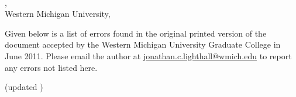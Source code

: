 \providecommand{\code}[1]{{\color{note_gray}#1}}
\cleardoublepage
{}
{}
\sloppy
\pagestyle{empty}
\begin{singlespace}%
\begin{center}
\vspace*{\titleskip}
\thesistitle\\
\vspace*{2.0\baselineskip}%
\authname, \degree\\
\vspace*{1.0\baselineskip}%
Western Michigan University, \abstdate{}%
\vspace*{1.0\baselineskip}%
\end{center}%

\label{errata_page}
Given below is a list of errors found in the original printed version of the document accepted by the Western Michigan University Graduate College in June 2011.  Please email the author at \href{mailto:jonathan.c.lighthall@wmich.edu}{jonathan.c.lighthall@wmich.edu} to report any errors not listed here.
\vspace{-4pt}%
\begin{itemize}
\setlength{\itemsep}{-2pt}%
  
\end{itemize}
\end{singlespace}
\centering
{}
(updated )